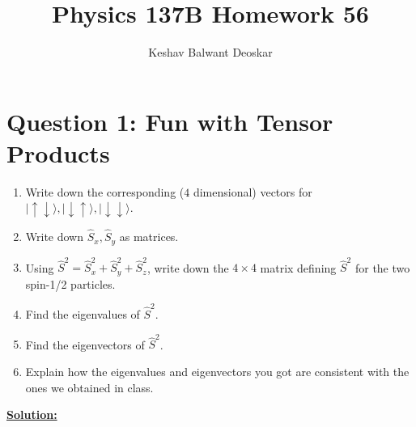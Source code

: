 \documentclass{article}
\title{Physics 137B Homework 56}
\author{Keshav Balwant Deoskar}
\newcommand{\ket}[1]{|#1 \rangle}
\begin{document}
\maketitle


\section*{Question 1: Fun with Tensor Products} 
\begin{enumerate}[label=(\alph*)]
  \item Write down the corresponding ($4$ dimensional) vectors for $\ket{\uparrow \downarrow}, \ket{\downarrow \uparrow}, \ket{\downarrow \downarrow}$.
  \item Write down $\hat{S}_x, \hat{S}_y$ as matrices.
  \item Using $\hat{S}^2 = \hat{S}_x^2 + \hat{S}_y^2 + \hat{S}_z^2$, write down the $4 \times 4$ matrix defining $\hat{S}^2$ for the two spin-1/2 particles.
  \item Find the eigenvalues of $\hat{S}^2$.
  \item Find the eigenvectors of $\hat{S}^2$.
  \item Explain how the eigenvalues and eigenvectors you got are consistent with the ones we obtained in class.
\end{enumerate}

\vskip 0.5cm
\underline{\textbf{Solution:}} 
\end{document}
